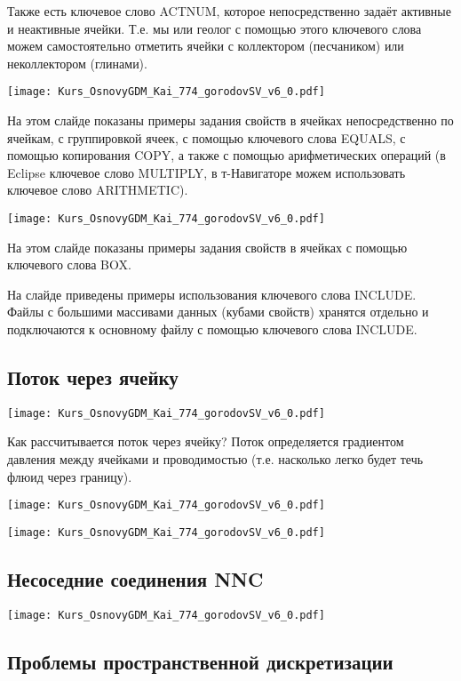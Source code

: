 \documentclass[main.tex]{subfiles}
\begin{document}
Также есть ключевое слово ACTNUM, которое непосредственно задаёт активные и неактивные ячейки. Т.е. мы или геолог с помощью этого ключевого слова можем самостоятельно отметить ячейки с коллектором (песчаником) или неколлектором (глинами).
 
\texttt{[image: Kurs\_OsnovyGDM\_Kai\_774\_gorodovSV\_v6\_0.pdf]}

На этом слайде показаны примеры задания свойств в ячейках непосредственно по ячейкам, с группировкой ячеек, с помощью ключевого слова EQUALS, с помощью копирования COPY, а также с помощью арифметических операций (в Eclipse ключевое слово MULTIPLY, в т-Навигаторе можем использовать ключевое слово ARITHMETIC).

\texttt{[image: Kurs\_OsnovyGDM\_Kai\_774\_gorodovSV\_v6\_0.pdf]}

На этом слайде показаны примеры задания свойств в ячейках с помощью ключевого слова BOX.

На слайде приведены примеры использования ключевого слова INCLUDE.
Файлы с большими массивами данных (кубами свойств) хранятся отдельно и подключаются к основному файлу с помощью ключевого слова INCLUDE.

\subsection{Поток через ячейку}

\texttt{[image: Kurs\_OsnovyGDM\_Kai\_774\_gorodovSV\_v6\_0.pdf]}

Как рассчитывается поток через ячейку?
Поток определяется градиентом давления между ячейками и проводимостью (т.е. насколько легко будет течь флюид через границу).

\texttt{[image: Kurs\_OsnovyGDM\_Kai\_774\_gorodovSV\_v6\_0.pdf]}

\texttt{[image: Kurs\_OsnovyGDM\_Kai\_774\_gorodovSV\_v6\_0.pdf]}

\subsection{Несоседние соединения NNC}

\texttt{[image: Kurs\_OsnovyGDM\_Kai\_774\_gorodovSV\_v6\_0.pdf]}

\subsection{Проблемы пространственной дискретизации}
\end{document}
